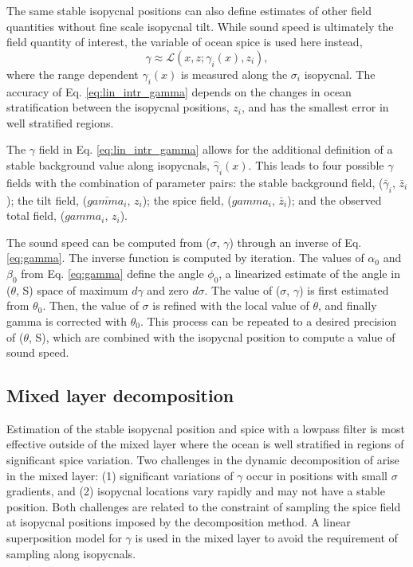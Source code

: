 \documentclass[preprint,NumberedRefs]{JASA}
\begin{document}
The same stable isopycnal positions can also define estimates of other field quantities without fine scale isopycnal tilt. While sound speed is ultimately the field quantity of interest, the variable of ocean spice is used here instead,
\begin{equation}
    \gamma\approx\mathcal{L}(x, z; \gamma_i(x), z_i),
    \label{eq:lin_intr_gamma}
\end{equation}
where the range dependent $\gamma_i(x)$ is measured along the $\sigma_i$ isopycnal. The accuracy of Eq. \eqref{eq:lin_intr_gamma} depends on the changes in ocean stratification between the isopycnal positions, $z_i$, and has the smallest error in well stratified regions.

The $\gamma$ field in Eq. \eqref{eq:lin_intr_gamma} allows for the additional definition of a stable background value along isopycnals, $\hat{\gamma}_i(x)$. This leads to four possible $\gamma$ fields with the combination of parameter pairs: the stable background field, ($\bar{\gamma}_i$, $\bar{z}_i$); the tilt field, ($\bar{gamma_i}$, $z_i$); the spice field, ($gamma_i$, $\bar{z}_i$); and the observed total field, ($gamma_i$, $z_i$).

The sound speed can be computed from ($\sigma$, $\gamma$) through an inverse of Eq. \eqref{eq:gamma}. The inverse function is computed by iteration. The values of $\alpha_0$ and $\beta_0$ from Eq. \eqref{eq:gamma} define the angle $\phi_0$, a linearized estimate of the angle in ($\theta$, S) space of maximum $d\gamma$ and zero $d\sigma$. The value of ($\sigma$, $\gamma$) is first estimated from $\theta_0$. Then, the value of $\sigma$ is refined with the local value of $\theta$, and finally gamma is corrected with $\theta_0$. This process can be repeated to a desired precision of ($\theta$, S), which are combined with the isopycnal position to compute a value of sound speed.


\subsection{Mixed layer decomposition}
Estimation of the stable isopycnal position and spice with a lowpass filter is most effective outside of the mixed layer where the ocean is well stratified in regions of significant spice variation. Two challenges in the dynamic decomposition of \citep{dzieciuch2004} arise in the mixed layer: (1) significant variations of $\gamma$ occur in positions with small $\sigma$ gradients, and (2) isopycnal locations vary rapidly and may not have a stable position. Both challenges are related to the constraint of sampling the spice field at isopycnal positions imposed by the decomposition method. A linear superposition model for $\gamma$ is used in the mixed layer to avoid the requirement of sampling along isopycnals.
\end{document}
